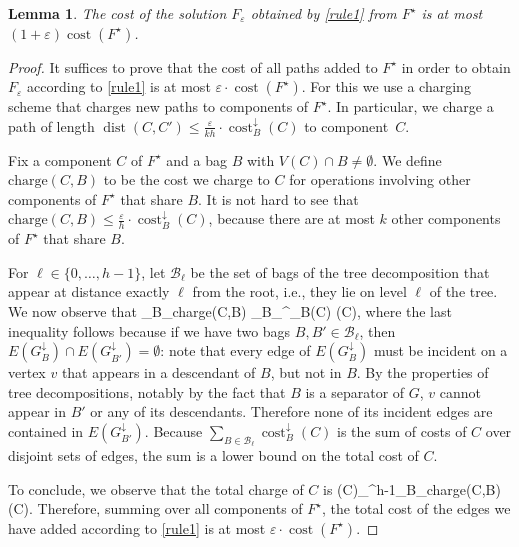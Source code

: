 \documentclass[a4paper]{article}
\theoremstyle{plain}
\newtheorem{lemma}[theorem]{Lemma}%
\newcommand{\eps}{{\varepsilon}}
\def\[#1\]{\begin{doitall}#1\end{doitall}}
\DeclareMathOperator{\cost}{cost}
\DeclareMathOperator{\dist}{dist}
\begin{document}
\begin{lemma}\label{lem:feps}
The cost of the solution $F_\eps$ obtained by \autoref{rule1} from $F^\star$ is at most $(1+\eps)\cost(F^\star)$.
\end{lemma}

\begin{proof}
It suffices to prove that the cost of all paths added to $F^\star$ in order to obtain $F_\eps$ according to \autoref{rule1}
is at most $\eps\cdot\cost(F^\star)$.
For this we use a charging scheme that charges new paths to components of $F^\star$. 
In particular, we charge a path of length $\dist(C,C')\le\frac{\eps}{kh}\cdot\cost^\downarrow_B(C)$ to component~$C$.

Fix a component $C$ of $F^\star$ and a bag $B$ with $V(C)\cap B \neq \emptyset$. We define $\textrm{charge}(C,B)$ to be the cost we charge to $C$ for operations involving other components of $F^\star$ that share $B$. It is not hard to see that $\textrm{charge}(C,B)\le \frac{\eps}{h}\cdot \cost^\downarrow_B(C)$, because there are at most $k$ other components of $F^\star$ that share $B$. 

For $\ell\in\{0,\ldots,h-1\}$, let $\mathcal{B}_\ell$ be the set of bags of the tree decomposition that appear at distance exactly $\ell$ from the root, i.e., they lie on level $\ell$ of the tree. We now observe that
\[
\sum_{B\in{}_\ell}\textrm{charge}(C,B) \le \sum_{B\in{}_\ell}\frac{\eps}{h}\cdot \cost^\downarrow_B(C) \le \frac{\eps}{h}\cost(C),
\]
where the last inequality follows because if we have two bags $B,B'\in
\mathcal{B}_\ell$, then $E(G^\downarrow_B)\cap E(G^\downarrow_{B'})=\emptyset$:
note that every edge of $E(G^\downarrow_B)$ must be incident on a vertex $v$
that appears in a descendant of $B$, but not in $B$. By the properties of tree
decompositions, notably by the fact that $B$ is a separator of $G$, $v$ cannot
appear in $B'$ or any of its descendants.  Therefore none of its incident edges
are contained in $E(G^\downarrow_{B'})$.  Because
$\sum_{B\in\mathcal{B}_\ell}\cost^\downarrow_B(C)$ is the sum of costs of $C$
over disjoint sets of edges, the sum is a lower bound on the total cost of $C$.

To conclude, we observe that the total charge of $C$ is 
\[
\textrm{charge}(C)\le \sum_{}^{h-1}\sum_{B\in{}_\ell}\textrm{charge}(C,B) \le \eps\cost(C).
\]
Therefore, summing over all components of $F^\star$, the total cost of the edges we have added according to \autoref{rule1} is at most $\eps\cdot\cost(F^\star)$.
\end{proof}
\end{document}
